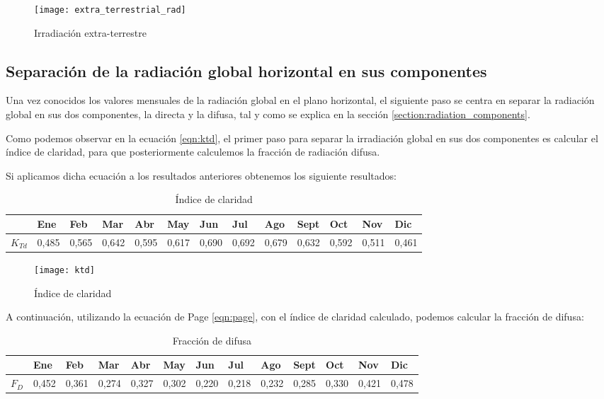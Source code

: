 \begin{figure}[ht]
\texttt{[image: extra\_terrestrial\_rad]}
\centering
\caption{Irradiación extra-terrestre}
\label{fig:mean_values_monthly}
\end{figure}

\subsection{Separación de la radiación global horizontal en sus componentes}

Una vez conocidos los valores mensuales de la radiación global en el plano horizontal, el siguiente paso se centra en separar la radiación global en sus dos componentes, la directa y la difusa, tal y como se explica en la sección \ref{section:radiation_components}.

Como podemos observar en la ecuación \ref{eqn:ktd}, el primer paso para separar la irradiación global en sus dos componentes es calcular el índice de claridad, para que posteriormente calculemos la fracción de radiación difusa. 

Si aplicamos dicha ecuación a los resultados anteriores obtenemos los siguiente resultados:

\begin{table}[ht]
\centering
\begin{tabular}{|l|l|l|l|l|l|l|l|l|l|l|l|l|}
\hline
    & Ene & Feb & Mar & Abr & May & Jun & Jul & Ago & Sept & Oct & Nov & Dic \\ \hline
$K_{Td}$ & 0,485 & 0,565 & 0,642 & 0,595 & 0,617 & 0,690 & 0,692 & 0,679 & 0,632 & 0,592 & 0,511  & 0,461  \\ \hline
\end{tabular}
\label{tab:clarity_index}
\caption{Índice de claridad}
\end{table}

\begin{figure}[ht]
\texttt{[image: ktd]}
\centering
\caption{Índice de claridad}
\label{fig:clarity_index}
\end{figure}


A continuación, utilizando la ecuación de Page \ref{eqn:page}, con el índice de claridad calculado, podemos calcular la fracción de difusa:

\begin{table}[ht]
\centering
\begin{tabular}{|l|l|l|l|l|l|l|l|l|l|l|l|l|}
\hline
   		& Ene   & Feb   & Mar   & Abr   & May   & Jun   & Jul   & Ago   & Sept  & Oct   & Nov    & Dic    \\ \hline
$F_{D}$ & 0,452 & 0,361 & 0,274 & 0,327 & 0,302 & 0,220 & 0,218 & 0,232 & 0,285 & 0,330 & 0,421  & 0,478  \\ \hline
\end{tabular}
\label{tab:difuse_part}
\caption{Fracción de difusa}
\end{table}

